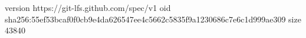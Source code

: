 version https://git-lfs.github.com/spec/v1
oid sha256:55ef53bcaf0f0cb9e4da626547ee4c5662c5835f9a1230686c7e6c1d999ae309
size 43840
